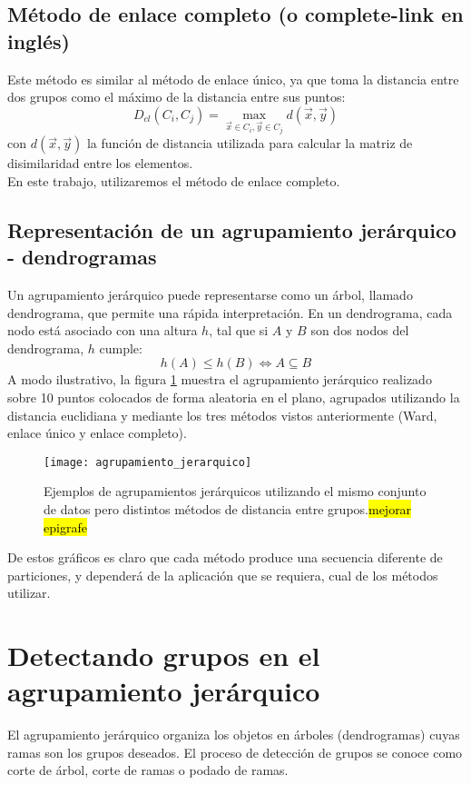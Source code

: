 \subsection{Método de enlace completo (o complete-link en inglés)}
Este método es similar al método de enlace único, ya que toma la distancia entre dos grupos como el máximo de la distancia entre sus puntos:
\begin{equation}
	D_{cl}(C_i, C_j) = \max\limits_{\vec{x} \in C_i, \vec{y} \in C_j} d(\vec{x}, \vec{y})
\end{equation}
con $d(\vec{x}, \vec{y})$ la función de distancia utilizada para calcular la matriz de disimilaridad entre los elementos.\\
En este trabajo, utilizaremos el método de enlace completo.
\cite{Shalizi2009, Gan2007, Johnson1967}

\subsection{Representación de un agrupamiento jerárquico - dendrogramas}
Un agrupamiento jerárquico puede representarse como un árbol, llamado dendrograma, que permite una rápida interpretación. En un dendrograma, cada nodo está asociado con una altura $h$, tal que si $A$ y $B$ son dos nodos del dendrograma, $h$ cumple:
\begin{equation}
	h(A) \leq h(B) \Leftrightarrow A \subseteq B
\end{equation}
A modo ilustrativo, la figura \ref{fig:agrupamiento_jerarquico} muestra el agrupamiento jerárquico realizado sobre 10 puntos colocados de forma aleatoria en el plano, agrupados utilizando la distancia euclidiana y mediante los tres métodos vistos anteriormente (Ward, enlace único y enlace completo).
\begin{figure}[h]
    \centering
    \texttt{[image: agrupamiento\_jerarquico]}
    \caption{Ejemplos de agrupamientos jerárquicos utilizando el mismo conjunto de datos pero distintos métodos de distancia entre grupos.\hl{mejorar epigrafe}}
    \label{fig:agrupamiento_jerarquico}
\end{figure}
De estos gráficos es claro que cada método produce una secuencia diferente de particiones, y dependerá de la aplicación que se requiera, cual de los métodos utilizar.
\section{Detectando grupos en el agrupamiento jerárquico}
El agrupamiento jerárquico organiza los objetos en árboles (dendrogramas) cuyas ramas son los grupos deseados. El proceso de detección de grupos se conoce como corte de árbol, corte de ramas o podado de ramas. 
